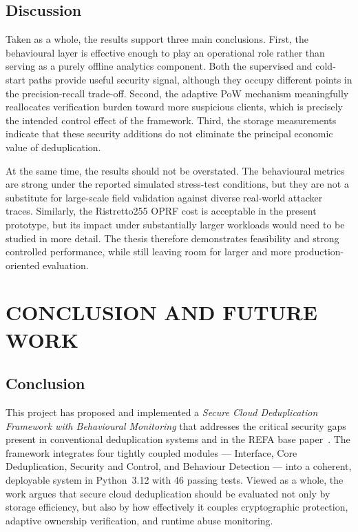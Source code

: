 \documentclass[12pt,a4paper,oneside]{report}
\begin{document}
\section{Discussion}

Taken as a whole, the results support three main conclusions.
First, the behavioural layer is effective enough to play an operational role rather than serving as a purely offline analytics component.
Both the supervised and cold-start paths provide useful security signal, although they occupy different points in the precision-recall trade-off.
Second, the adaptive PoW mechanism meaningfully reallocates verification burden toward more suspicious clients, which is precisely the intended control effect of the framework.
Third, the storage measurements indicate that these security additions do not eliminate the principal economic value of deduplication.

At the same time, the results should not be overstated.
The behavioural metrics are strong under the reported simulated stress-test conditions, but they are not a substitute for large-scale field validation against diverse real-world attacker traces.
Similarly, the Ristretto255 OPRF cost is acceptable in the present prototype, but its impact under substantially larger workloads would need to be studied in more detail.
The thesis therefore demonstrates feasibility and strong controlled performance, while still leaving room for larger and more production-oriented evaluation.

\chapter{CONCLUSION AND FUTURE WORK}

\section{Conclusion}

This project has proposed and implemented a \textit{Secure Cloud Deduplication Framework with Behavioural Monitoring} that addresses the critical security gaps present in conventional deduplication systems and in the REFA base paper~\cite{wu2024refa}.
The framework integrates four tightly coupled modules --- Interface, Core Deduplication, Security and Control, and Behaviour Detection --- into a coherent, deployable system in Python~3.12 with 46 passing tests.
Viewed as a whole, the work argues that secure cloud deduplication should be evaluated not only by storage efficiency, but also by how effectively it couples cryptographic protection, adaptive ownership verification, and runtime abuse monitoring.
\end{document}
